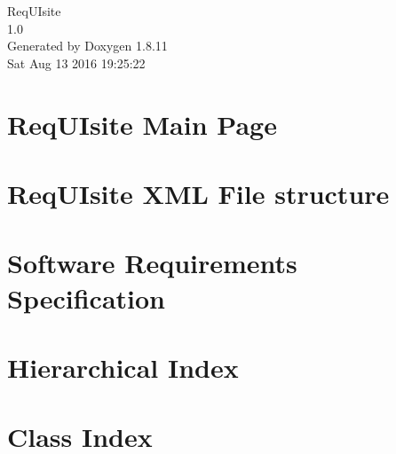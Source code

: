 \documentclass[twoside]{book}
\newcommand{\+}{\discretionary{\mbox{\scriptsize$\hookleftarrow$}}{}{}}
\newcommand{\clearemptydoublepage}{%
  \newpage{\pagestyle{empty}\cleardoublepage}%
}
\begin{document}
\hypersetup{pageanchor=false,
             bookmarksnumbered=true,
             pdfencoding=unicode
            }
\begin{titlepage}
\vspace*{7cm}
\begin{center}%
{\Large Req\+U\+Isite \\[1ex]\large 1.\+0 }\\
\vspace*{1cm}
{\large Generated by Doxygen 1.8.11}\\
\vspace*{0.5cm}
{\small Sat Aug 13 2016 19:25:22}\\
\end{center}
\end{titlepage}
\clearemptydoublepage
\tableofcontents
\clearemptydoublepage
{}
\hypersetup{pageanchor=true}

\chapter{Req\+U\+Isite Main Page}
\label{index}\hypertarget{index}{}
\chapter{Req\+U\+Isite X\+ML File structure}
\label{md_pages_XMLFileStructure}
\hypertarget{md_pages_XMLFileStructure}{}

\chapter{Software Requirements Specification}
\label{md_resources_README}
\hypertarget{md_resources_README}{}

\chapter{Hierarchical Index}

\chapter{Class Index}

\end{document}
